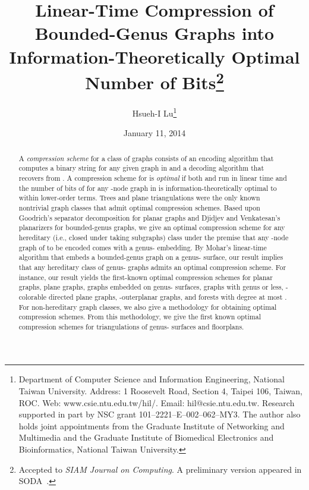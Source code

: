 \documentclass[12pt]{article}
\title{Linear-Time Compression of Bounded-Genus Graphs into
Information-Theoretically Optimal Number of Bits\thanks{Accepted to {\em SIAM Journal on Computing}. A 
preliminary version appeared in SODA~\cite{Lu02}.}}
\author{Hsueh-I Lu\thanks{Department of Computer Science and
    Information Engineering, National Taiwan University.  Address: 1
    Roosevelt Road, Section 4, Taipei 106, Taiwan, ROC.  Web:
    www.csie.ntu.edu.tw/hil/.  Email: hil@csie.ntu.edu.tw.
    Research supported in part by NSC grant 101--2221--E--002--062--MY3.
The author also holds joint appointments from the Graduate
    Institute of Networking and Multimedia and the Graduate Institute
    of Biomedical Electronics and Bioinformatics, National Taiwan
    University.}
}
\date{January 11, 2014}
\begin{document}
\maketitle 
\begin{abstract}
A {\em compression scheme}  for a class  of graphs consists of
an encoding algorithm  that computes a binary
string  for any given graph  in  and a
decoding algorithm  that recovers  from
.  A compression scheme  for  is {\em
  optimal} if both  and  run in
linear time and the number of bits of  for any
-node graph  in  is information-theoretically optimal to
within lower-order terms.  Trees and plane triangulations were the
only known nontrivial graph classes that admit optimal compression
schemes.  Based upon Goodrich's separator decomposition for planar
graphs and Djidjev and Venkatesan's planarizers for bounded-genus
graphs, we give an optimal compression scheme for any hereditary
(i.e., closed under taking subgraphs) class  under the premise
that any -node graph of  to be encoded comes with a
genus- embedding.  By Mohar's linear-time
algorithm that embeds a bounded-genus graph on a genus- surface,
our result implies that any hereditary class of genus- graphs
admits an optimal compression scheme.
For instance, our result yields the first-known optimal compression
schemes for planar graphs, plane graphs, graphs embedded on genus-
surfaces, graphs with genus  or less, -colorable directed plane
graphs, -outerplanar graphs, and forests with degree at most .
For non-hereditary graph classes, we also give a methodology for
obtaining optimal compression schemes. From this methodology, we give
the first known optimal compression schemes for triangulations of
genus- surfaces and floorplans.
\end{abstract}
\end{document}
